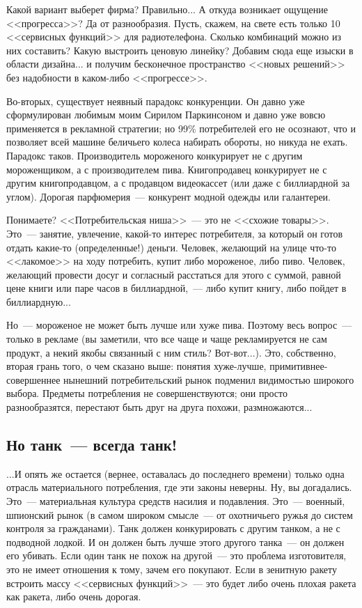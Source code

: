 \documentclass{scrbook}
\newcommand{\flqq}{<<}
\newcommand{\frqq}{>>}
\newcommand{\mdash}{~--- }
\newcommand{\commamdash}{~--- } %
\newcommand{\essaysection}[1]{\subsection*{#1}\nopagebreak}
\begin{document}
Какой вариант выберет фирма? Правильно... А откуда возникает ощущение {\flqq}прогресса{\frqq}? Да от разнообразия. Пусть, скажем, на свете есть только 10 {\flqq}сервисных функций{\frqq} для радиотелефона. Сколько комбинаций можно из них составить? Какую выстроить ценовую линейку? Добавим сюда еще изыски в области дизайна... и получим бесконечное пространство {\flqq}новых решений{\frqq} без надобности в каком-либо {\flqq}прогрессе{\frqq}.

Во-вторых, существует неявный парадокс конкуренции. Он давно уже сформулирован любимым моим Сирилом Паркинсоном и давно уже вовсю применяется в рекламной стратегии; но 99\% потребителей его не осознают, что и позволяет всей машине беличьего колеса набирать обороты, но никуда не ехать. Парадокс таков. Производитель мороженого конкурирует не с другим мороженщиком, а с производителем пива. Книгопродавец конкурирует не с другим книгопродавцом, а с продавцом видеокассет (или даже с биллиардной за углом). Дорогая парфюмерия{\mdash}конкурент модной одежды или галантереи.

Понимаете? {\flqq}Потребительская ниша{\frqq}{\mdash}это не {\flqq}схожие товары{\frqq}. Это{\mdash}занятие, увлечение, какой-то интерес потребителя, за который он готов отдать какие-то (определенные!) деньги. Человек, желающий на улице что-то {\flqq}лакомое{\frqq} на ходу потребить, купит либо мороженое, либо пиво. Человек, желающий провести досуг и согласный расстаться для этого с суммой, равной цене книги или паре часов в биллиардной,{\commamdash}либо купит книгу, либо пойдет в биллиардную...

Но{\mdash}мороженое не может быть лучше или хуже пива. Поэтому весь вопрос{\mdash}только в рекламе (вы заметили, что все чаще и чаще рекламируется не сам продукт, а некий якобы связанный с ним стиль? Вот-вот...). Это, собственно, вторая грань того, о чем сказано выше: понятия хуже-лучше, примитивнее-совершеннее нынешний потребительский рынок подменил видимостью широкого выбора. Предметы потребления не совершенствуются; они просто разнообразятся, перестают быть друг на друга похожи, размножаются...

\essaysection{Но танк{\mdash}всегда танк!}

...И опять же остается (вернее, оставалась до последнего времени) только одна отрасль материального потребления, где эти законы неверны. Ну, вы догадались. Это{\mdash}материальная культура средств насилия и подавления. Это{\mdash}военный, шпионский рынок (в самом широком смысле{\mdash}от охотничьего ружья до систем контроля за гражданами). Танк должен конкурировать с другим танком, а не с подводной лодкой. И он должен быть лучше этого другого танка{\mdash}он должен его убивать. Если один танк не похож на другой{\mdash}это проблема изготовителя, это не имеет отношения к тому, зачем его покупают. Если в зенитную ракету встроить массу {\flqq}сервисных функций{\frqq}{\mdash}это будет либо очень плохая ракета как ракета, либо очень дорогая.
\end{document}
